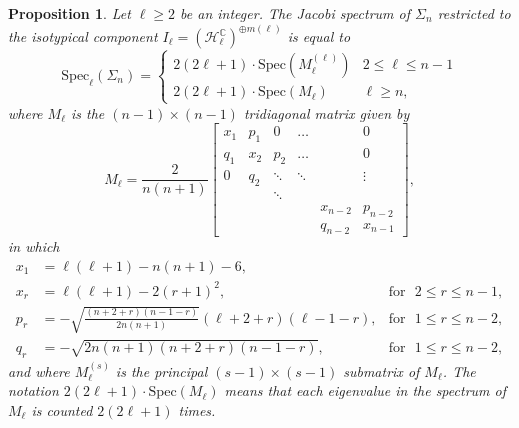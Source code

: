 \documentclass[11pt]{article}
\newcommand{\C}{\mathbb{C}}
\newtheorem{prop}[thm]{Proposition}
\theoremstyle{definition}
\numberwithin{equation}{section}
\begin{document}
    
\begin{prop}\label{prop:isospectrum} Let $\ell \geq 2$ be an integer.  The Jacobi spectrum of $\Sigma_n$ restricted to the isotypical component $I_\ell = (\mathcal{H}_\ell^\C)^{\oplus m(\ell)}$ is equal to
    \begin{equation*}
        \mathrm{Spec}_{\ell} ( \Sigma_n) = \begin{cases}
            2(2\ell + 1) \cdot \mathrm{Spec}(M_{\ell}^{(\ell)}) & 2 \leq \ell \leq n-1 \\
            2(2\ell + 1) \cdot \mathrm{Spec}(M_{\ell}) & \ell \geq n,
        \end{cases}
    \end{equation*}
where $M_\ell$ is the $(n-1) \times (n-1)$ tridiagonal matrix given by
\begin{equation*}
    M_{\ell} = \frac{2}{n(n+1)} \begin{bmatrix}
    x_1 & p_{1} & 0   & \dots  &   & 0   \\
    q_1  & x_2       & p_2   & \dots  &   & 0   \\
    0  &     q_2    & \ddots         & \ddots  &  & \vdots    \\
    & & \ddots & & & \\
      &         &      &     &     x_{n-2}      & p_{n-2}   \\
      &         &      &     &     q_{n-2}      & x_{n-1}
  \end{bmatrix},
  \end{equation*}
in which
\begin{equation}
    \begin{aligned}
        x_1 &= \ell(\ell+1) - n(n+1) - 6, \\
         x_r & = \ell(\ell+1) - 2(r+1)^2, & \text{for} \:\:\: 2 \leq r \leq n-1, \\
        p_r &= -\sqrt{\frac{(n+2+r)(n-1-r)}{2n(n+1)}}(\ell+2+r)(\ell - 1 - r), & \text{for} \:\:\: 1 \leq r \leq n-2, \\
        q_r &= -\sqrt{2n(n+1)(n+2+r)(n-1-r)}, & \text{for} \:\:\: 1 \leq r \leq n-2,
    \end{aligned}
\end{equation}
and where $M_{\ell}^{(s)}$ is the principal $(s-1) \times (s-1)$ submatrix of $M_{\ell}$.  The notation $2(2\ell + 1) \cdot \mathrm{Spec}(M_\ell)$ means that each eigenvalue in the spectrum of $M_\ell$ is counted $2(2\ell + 1)$ times.
\end{prop}
\end{document}
